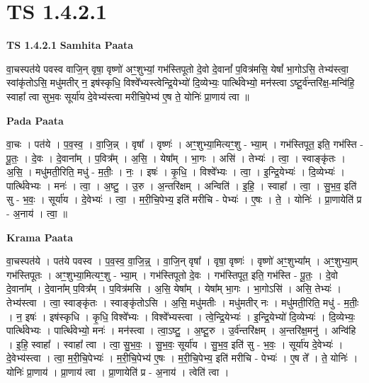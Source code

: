 \documentclass[17pt]{extarticle}
\begin{document}
\section{ TS 1.4.2.1 }

\textbf{TS 1.4.2.1 } \newline
\textbf{Samhita Paata} \newline

वा॒चस्पत॑ये पवस्व वाजि॒न् वृषा॒ वृष्णो॑ अꣳ॒॒शुभ्यां॒ गभ॑स्तिपूतो दे॒वो दे॒वानां᳚ प॒वित्र॑मसि॒ येषां᳚ भा॒गोऽसि॒ तेभ्य॑स्त्वा॒ स्वांकृ॑तोऽसि॒ मधु॑मतीर् न॒ इष॑स्कृधि॒ विश्वे᳚भ्यस्त्वेन्द्रि॒येभ्यो॑ दि॒व्येभ्यः॒ पार्त्थि॑वेभ्यो॒ मन॑स्त्वा ऽष्टू॒र्व॑न्तरि॑क्ष॒-मन्वि॑हि॒ स्वाहा᳚ त्वा सुभ॒वः सूर्या॑य दे॒वेभ्य॑स्त्वा मरीचि॒पेभ्य॑ ए॒ष ते॒ योनिः॑ प्रा॒णाय॑ त्वा ॥ \newline

\textbf{Pada Paata} \newline

वा॒चः । पत॑ये । प॒व॒स्व॒ । वा॒जि॒न्न् । वृषा᳚ । वृष्णः॑ । अꣳ॒॒शुभ्या॒मित्यꣳ॒॒शु - भ्या॒म् । गभ॑स्तिपूत॒ इति॒ गभ॑स्ति - पू॒तः॒ । दे॒वः । दे॒वाना᳚म् । प॒वित्र᳚म् । अ॒सि॒ । येषा᳚म् । भा॒गः । असि॑ । तेभ्यः॑ । त्वा॒ । स्वाङ्कृ॑तः । अ॒सि॒ । मधु॑मती॒रिति॒ मधु॑ - म॒तीः॒ । नः॒ । इषः॑ । कृ॒धि॒ । विश्वे᳚भ्यः । त्वा॒ । इ॒न्द्रि॒येभ्यः॑ । दि॒व्येभ्यः॑ । पार्त्थि॑वेभ्यः । मनः॑ । त्वा॒ । अ॒ष्टु॒ । उ॒रु । अ॒न्तरि॑क्षम् । अन्विति॑ । इ॒हि॒ । स्वाहा᳚ । त्वा॒ । सु॒भ॒व॒ इति॑ सु - भ॒वः॒ । सूर्या॑य । दे॒वेभ्यः॑ । त्वा॒ । म॒री॒चि॒पेभ्य॒ इति॑ मरीचि - पेभ्यः॑ । ए॒षः । ते॒ । योनिः॑ । प्रा॒णायेति॑ प्र - अ॒नाय॑ । त्वा॒ ॥  \newline


\textbf{Krama Paata} \newline

वा॒चस्पत॑ये । पत॑ये पवस्व । प॒व॒स्व॒ वा॒जि॒न्न्॒ । वा॒जि॒न् वृषा᳚ । वृषा॒ वृष्णः॑ । वृष्णो॑ अꣳ॒॒शुभ्या᳚म् । अꣳ॒॒शुभ्या॒म् गभ॑स्तिपूतः । अꣳ॒॒शुभ्या॒मित्यꣳ॒॒शु - भ्या॒म् । गभ॑स्तिपूतो दे॒वः । गभ॑स्तिपूत॒ इति॒ गभ॑स्ति - पू॒तः॒ । दे॒वो दे॒वाना᳚म् । दे॒वाना᳚म् प॒वित्र᳚म् । प॒वित्र॑मसि । अ॒सि॒ येषा᳚म् । येषा᳚म् भा॒गः । भा॒गोऽसि॑ । असि॒ तेभ्यः॑ । तेभ्य॑स्त्वा । त्वा॒ स्वाङ्कृ॑तः । स्वाङ्कृ॑तोऽसि । अ॒सि॒ मधु॑मतीः । मधु॑मतीर् नः । मधु॑मती॒रिति॒ मधु॑ - म॒तीः॒ । न॒ इषः॑ । इष॑स्कृधि । कृ॒धि॒ विश्वे᳚भ्यः । विश्वे᳚भ्यस्त्वा । त्वे॒न्द्रि॒येभ्यः॑ । इ॒न्द्रि॒येभ्यो॑ दि॒व्येभ्यः॑ । दि॒व्येभ्यः॒ पार्त्थि॑वेभ्यः । पार्त्थि॑वेभ्यो॒ मनः॑ । मन॑स्त्वा । त्वा॒ऽष्टु॒ । अ॒ष्टू॒रु । उ॒र्व॑न्तरि॑क्षम् । अ॒न्तरि॑क्ष॒मनु॑ । अन्वि॑हि । इ॒हि॒ स्वाहा᳚ । स्वाहा᳚ त्वा । त्वा॒ सु॒भ॒वः॒ । सु॒भ॒वः॒ सूर्या॑य । सु॒भ॒व॒ इति॑ सु - भ॒वः॒ । सूर्या॑य दे॒वेभ्यः॑ । दे॒वेभ्य॑स्त्वा । त्वा॒ म॒री॒चि॒पेभ्यः॑ । म॒री॒चि॒पेभ्य॑ ए॒षः । म॒री॒चि॒पेभ्य॒ इति॑ मरीचि - पेभ्यः॑ । ए॒ष ते᳚ । ते॒ योनिः॑ । योनिः॑ प्रा॒णाय॑ । प्रा॒णाय॑ त्वा । प्रा॒णायेति॑ प्र - अ॒नाय॑ । त्वेति॑ त्वा । \newline
\end{document}

